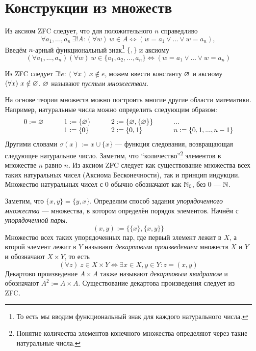\section{Конструкции из множеств}

Из аксиом ZFC следует, что для положительного $n$ справедливо
\[
  \forall a_1,...,a_{n}~\exists !A:(\forall w)~
  w\in A\iff (w=a_1\lor...\lor w=a_{n}),
\]
Введём $n$-арный функциональный знак\footnote{
  То есть мы вводим функциональный знак для каждого натурального числа.}
$\{,\}$ и аксиому
\[
  (\forall a_1,...,a_{n})(\forall w)~
  w\in \{a_1,a_2,...,a_{n}\}\iff (w=a_1\lor ...\lor w=a_{n})
\]

Из ZFC следует ${\exists !e:(\forall x)~x\notin e}$,
можем ввести константу $\varnothing$ и аксиому $(\forall x)~x\notin \varnothing$.
$\varnothing$ называют {\it пустым множеством}.

На основе теории множеств можно построить многие другие области математики.
Например, натуральные числа можно определить следующим образом:
\[
  \begin{array}{llll}
    0 :=\varnothing\qquad & 1  :=\{\varnothing\}\qquad & 2  :=\{\varnothing,\{\varnothing\}\}\qquad & ... \\
                    & 1:=\{0\}\qquad       & 2:=\{0,1\}
                    & n:=\{0,1,...,n-1\}
  \end{array}
\]
Другими словами $\sigma(x):=x\cup \{x\}$ --- функция следования,
возвращающая следующее натуральное число. Заметим, что ``количество''\footnote{
  Понятие количества элементов конечного множества определяют
  через такие натуральные числа.} элементов
в множестве $n$ равно $n$. Из аксиом ZFC следует как существование множества
всех таких натуральных чисел (Аксиома Бесконечности), так и принцип индукции.
Множество натуральных чисел с $0$ обычно обозначают как $\mathbb N_0$,
без $0$ --- $\mathbb N$.

Заметим, что $\{x,y\}=\{y,x\}$. Определим способ задания
{\it упорядоченного множества} --- множества, в котором определён порядок элементов.
Начнём с {\it упорядоченной пары}.
\[
  (x,y):=\{\{x\},\{x,y\}\}
\]
Множество
всех таких упорядоченных пар, где первый элемент лежит в $X$, а второй элемент
лежит в $Y$ называют {\it декартовым произведением}
 множеств $X$ и $Y$ и
обозначают $X\times Y$, то есть
\[
  (\forall z)~z\in X\times Y\iff \exists x\in X,y\in Y:z=(x,y)
\]
Декартово произведение $A\times A$ также называют {\it декартовым квадратом}
и обозначают $A^{2}:=A\times A$. Существование декартова произведения следует из ZFC.

